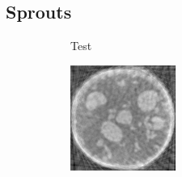 \documentclass{article}
\begin{document}
\subsection{Sprouts}
\begin{figure}[!h]
    \begin{subfigure}[b]{0.38\linewidth}
        \caption{Test}
     \end{subfigure}
\quad
    \begin{subfigure}[b]{0.38\linewidth}
        \includegraphics[width=\textwidth]{../images/sprouts/fdkIm.png}

\end{subfigure}
\end{figure}
\end{document}

